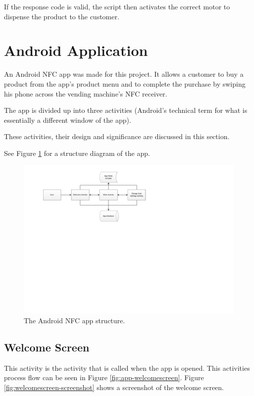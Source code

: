 If the response code is valid, the script then activates the correct motor to
dispense the product to the customer.

\section{Android Application}
\label{sec:nfc-android-app}

An Android NFC app was made for this project. It allows a customer to buy a
product from the app's product menu and to complete the purchase by swiping
his phone across the vending machine's NFC receiver.

The app is divided up into three activities (Android's technical term for what
is essentially a different window of the app). 

These activities, their design and significance are discussed in this section.

See Figure \ref{fig:nfc_app_structure} for a structure
diagram of the app.

\begin{figure}
 \centering 
 \includegraphics[clip = true, trim = 0 360 0 20,
 scale=0.7]{app_structure}
 \caption{The Android NFC app structure.}
 \label{fig:nfc_app_structure}
\end{figure}

\subsection{Welcome Screen}

This activity is the activity that is called when the app is opened. This
activities process flow can be seen in Figure \ref{fig:app-welcomescreen}.
Figure \ref{fig:welcomescreen-screenshot} shows a screenshot of the welcome
screen.

